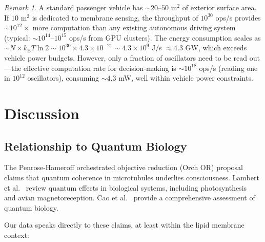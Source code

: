 \documentclass[twocolumn,10pt,a4paper]{article}
\theoremstyle{definition}
\theoremstyle{remark}
\newtheorem{remark}[theorem]{Remark}
\newcommand{\kB}{k_{\mathrm{B}}}
\begin{document}
\begin{remark}
A standard passenger vehicle has $\sim 20$--$50$ m$^2$ of exterior surface area. If $10$ m$^2$ is dedicated to membrane sensing, the throughput of $10^{30}$ ops/s provides $\sim 10^{12}\times$ more computation than any existing autonomous driving system (typical: $\sim 10^{14}$--$10^{15}$ ops/s from GPU clusters). The energy consumption scales as $\sim N \times \kB T \ln 2 \sim 10^{30} \times 4.3 \times 10^{-21} \sim 4.3 \times 10^{9}$ J/s $\approx 4.3$ GW, which exceeds vehicle power budgets. However, only a fraction of oscillators need to be read out---the effective computation rate for decision-making is $\sim 10^{18}$ ops/s (reading one in $10^{12}$ oscillators), consuming $\sim 4.3$ mW, well within vehicle power constraints.
\end{remark}


\section{Discussion}
\label{sec:discussion}

\subsection{Relationship to Quantum Biology}

The Penrose-Hameroff orchestrated objective reduction (Orch OR) proposal~\citep{penrose1989emperor, hameroff1996orchestrated} claims that quantum coherence in microtubules underlies consciousness. Lambert et al.~\citep{lambert2013quantum} review quantum effects in biological systems, including photosynthesis~\citep{engel2007evidence} and avian magnetoreception. Cao et al.~\citep{cao2020quantum} provide a comprehensive assessment of quantum biology.

Our data speaks directly to these claims, at least within the lipid membrane context:
\end{document}

